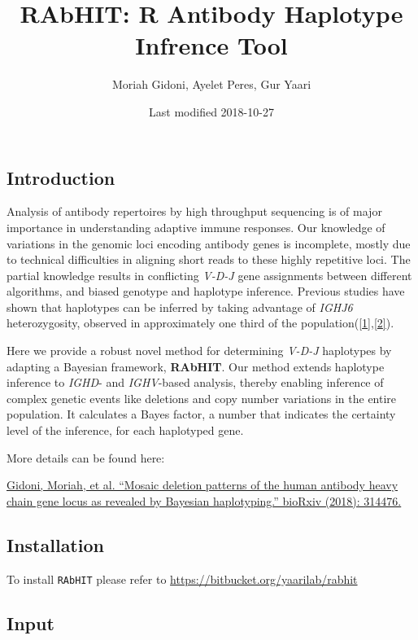 \documentclass[11pt,]{article}
\title{RAbHIT: R Antibody Haplotype Infrence Tool}
\author{Moriah Gidoni, Ayelet Peres, Gur Yaari}
\date{Last modified 2018-10-27}
\begin{document}
\maketitle

{
\hypersetup{linkcolor=black}
\setcounter{tocdepth}{2}
\tableofcontents
}
\subsection{Introduction}\label{introduction}

Analysis of antibody repertoires by high throughput sequencing is of
major importance in understanding adaptive immune responses. Our
knowledge of variations in the genomic loci encoding antibody genes is
incomplete, mostly due to technical difficulties in aligning short reads
to these highly repetitive loci. The partial knowledge results in
conflicting \emph{V-D-J} gene assignments between different algorithms,
and biased genotype and haplotype inference. Previous studies have shown
that haplotypes can be inferred by taking advantage of \emph{IGHJ6}
heterozygosity, observed in approximately one third of the
population(\href{https://www.ncbi.nlm.nih.gov/pubmed/22205028}{{[}1{]}},\href{https://www.ncbi.nlm.nih.gov/pubmed/28388445}{{[}2{]}}).

Here we provide a robust novel method for determining \emph{V-D-J}
haplotypes by adapting a Bayesian framework, \textbf{RAbHIT}. Our method
extends haplotype inference to \emph{IGHD}- and \emph{IGHV}-based
analysis, thereby enabling inference of complex genetic events like
deletions and copy number variations in the entire population. It
calculates a Bayes factor, a number that indicates the certainty level
of the inference, for each haplotyped gene.

More details can be found here:

\href{https://doi.org/10.1101/314476}{Gidoni, Moriah, et al. ``Mosaic
deletion patterns of the human antibody heavy chain gene locus as
revealed by Bayesian haplotyping.'' bioRxiv (2018): 314476.}

\subsection{Installation}\label{installation}

To install \texttt{RAbHIT} please refer to
\url{https://bitbucket.org/yaarilab/rabhit}

\subsection{Input}\label{input}
\end{document}

